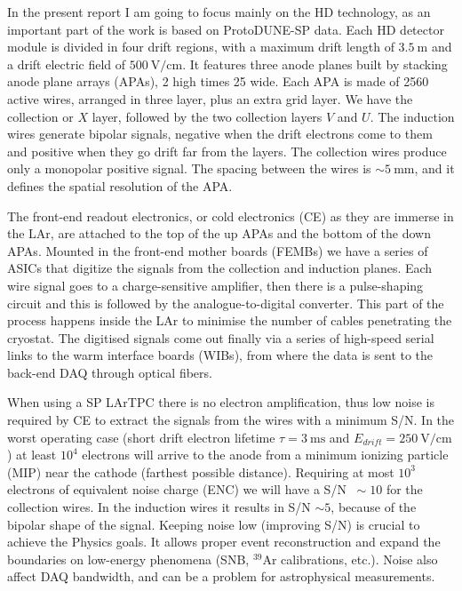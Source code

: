 In the present report I am going to focus mainly on the HD technology, as an important part of the work is based on ProtoDUNE-SP data. Each HD detector module is divided in four drift regions, with a maximum drift length of $3.5 \ \mathrm{m}$ and a drift electric field of $500 \ \mathrm{V/cm}$. It features three anode planes built by stacking anode plane arrays (APAs), 2 high times 25 wide. Each APA is made of 2560 active wires, arranged in three layer, plus an extra grid layer. We have the collection or $X$ layer, followed by the two collection layers $V$ and $U$. The induction wires generate bipolar signals, negative when the drift electrons come to them and positive when they go drift far from the layers. The collection wires produce only a monopolar positive signal. The spacing between the wires is $\sim 5 \ \mathrm{mm}$, and it defines the spatial resolution of the APA.

The front-end readout electronics, or cold electronics (CE) as they are immerse in the LAr, are attached to the top of the up APAs and the bottom of the down APAs. Mounted in the front-end mother boards (FEMBs) we have a series of ASICs that digitize the signals from the collection and induction planes. Each wire signal goes to a charge-sensitive amplifier, then there is a pulse-shaping circuit and this is followed by the analogue-to-digital converter. This part of the process happens inside the LAr to minimise the number of cables penetrating the cryostat. The digitised signals come out finally via a series of high-speed serial links to the warm interface boards (WIBs), from where the data is sent to the back-end DAQ through optical fibers.

When using a SP LArTPC there is no electron amplification, thus low noise is required by CE to extract the signals from the wires with a minimum S/N. In the worst operating case (short drift electron lifetime $\tau = 3 \ \mathrm{ms}$ and $E_{drift} = 250 \ \mathrm{V/cm}$) at least $10^{4}$ electrons will arrive to the anode from a minimum ionizing particle (MIP) near the cathode (farthest possible distance). Requiring at most $10^{3}$ electrons of equivalent noise charge (ENC) we will have a S/N $~\sim10$ for the collection wires. In the induction wires it results in S/N $\sim 5$, because of the bipolar shape of the signal. Keeping noise low (improving S/N) is crucial to achieve the Physics goals. It allows proper event reconstruction and expand the boundaries on low-energy phenomena (SNB, $^{39}$Ar calibrations, etc.). Noise also affect DAQ bandwidth, and can be a problem for astrophysical measurements.

